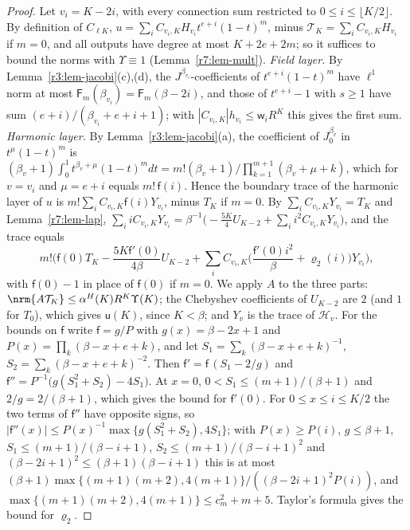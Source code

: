 \begin{proof}
Let $v_i=K-2i$, with every connection sum restricted to $0\leq i\leq\lfloor K/2\rfloor$. By definition of $C_{\ell K}$, $u=\sum_iC_{v_i,K}H_{v_i}t^{e+i}(1-t)^m$, minus $\mathcal T_K=\sum_iC_{v_i,K}H_{v_i}$ if $m=0$, and all outputs have degree at most $K+2e+2m$; so it suffices to bound the norms with $\Upsilon\equiv1$ (Lemma~\ref{r7:lem-mult}). \emph{Field layer.} By Lemma~\ref{r3:lem-jacobi}(c),(d), the $J^{\beta_{v_i}}$-coefficients of $t^{e+i}(1-t)^m$ have $\ell^1$ norm at most $\mathsf F_m(\beta_{v_i})=\mathsf F_m(\beta-2i)$, and those of $t^{e+i}-1$ with $s\geq1$ have sum $(e+i)/(\beta_{v_i}+e+i+1)$; with $|C_{v_i,K}|h_{v_i}\leq\mathsf w_iR^K$ this gives the first sum. \emph{Harmonic layer.} By Lemma~\ref{r3:lem-jacobi}(a), the coefficient of $J^{\beta_v}_0$ in $t^\mu(1-t)^m$ is $(\beta_v+1)\int_0^1t^{\beta_v+\mu}(1-t)^mdt=m!(\beta_v+1)/\prod_{k=1}^{m+1}(\beta_v+\mu+k)$, which for $v=v_i$ and $\mu=e+i$ equals $m!\,\mathsf f(i)$. Hence the boundary trace of the harmonic layer of $u$ is $m!\sum_iC_{v_i,K}\mathsf f(i)Y_{v_i}$, minus $T_K$ if $m=0$. By $\sum_iC_{v_i,K}Y_{v_i}=T_K$ and Lemma~\ref{r7:lem-lap}, $\sum_iiC_{v_i,K}Y_{v_i}=\beta^{-1}\big(-\frac{5K}4U_{K-2}+\sum_ii^2C_{v_i,K}Y_{v_i}\big)$, and the trace equals
\[
m!\Big(\mathsf f(0)T_K-\frac{5K\mathsf f'(0)}{4\beta}U_{K-2}+\sum_iC_{v_i,K}\Big(\frac{\mathsf f'(0)i^2}\beta+\varrho_2(i)\Big)Y_{v_i}\Big),
\]
with $\mathsf f(0)-1$ in place of $\mathsf f(0)$ if $m=0$. We apply $A$ to the three parts: $\nrm{A\mathcal T_K}\leq\alpha^H(K)R^K\Upsilon(K)$; the Chebyshev coefficients of $U_{K-2}$ are $2$ (and $1$ for $T_0$), which gives $\mathsf u(K)$, since $K<\beta$; and $Y_{v}$ is the trace of $\mathcal H_v$. For the bounds on $\mathsf f$ write $\mathsf f=g/P$ with $g(x)=\beta-2x+1$ and $P(x)=\prod_k(\beta-x+e+k)$, and let $S_1=\sum_k(\beta-x+e+k)^{-1}$, $S_2=\sum_k(\beta-x+e+k)^{-2}$. Then $\mathsf f'=\mathsf f\,(S_1-2/g)$ and $\mathsf f''=P^{-1}\big(g(S_1^2+S_2)-4S_1\big)$. At $x=0$, $0<S_1\leq(m+1)/(\beta+1)$ and $2/g=2/(\beta+1)$, which gives the bound for $\mathsf f'(0)$. For $0\leq x\leq i\leq K/2$ the two terms of $\mathsf f''$ have opposite signs, so $|\mathsf f''(x)|\leq P(x)^{-1}\max\{g(S_1^2+S_2),4S_1\}$; with $P(x)\geq P(i)$, $g\leq\beta+1$, $S_1\leq(m+1)/(\beta-i+1)$, $S_2\leq(m+1)/(\beta-i+1)^2$ and $(\beta-2i+1)^2\leq(\beta+1)(\beta-i+1)$ this is at most $(\beta+1)\max\{(m+1)(m+2),4(m+1)\}/((\beta-2i+1)^2P(i))$, and $\max\{(m+1)(m+2),4(m+1)\}\leq c_m^2+m+5$. Taylor's formula gives the bound for $\varrho_2$.
\end{proof}

